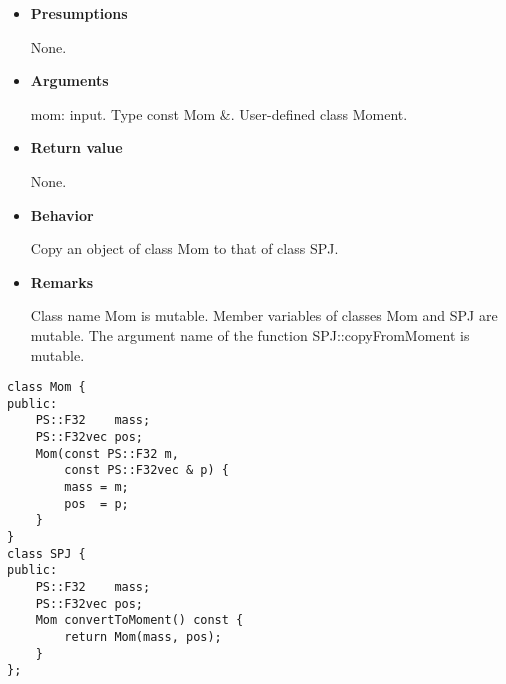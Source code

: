 \begin{itemize}

\item {\bf Presumptions}

  None.
  
\item {\bf Arguments}

   mom: input. Type const Mom \&. User-defined class Moment.

\item {\bf Return value}

  None.
  
\item {\bf Behavior}

  Copy an object of class Mom to that of class SPJ.

\item {\bf Remarks}

  Class name Mom is mutable. Member variables of classes Mom and SPJ
  are mutable. The argument name of the function SPJ::copyFromMoment
  is mutable.

\end{itemize}


\begin{screen}
\begin{verbatim}
class Mom {
public:
    PS::F32    mass;
    PS::F32vec pos;
    Mom(const PS::F32 m,
        const PS::F32vec & p) {
        mass = m;
        pos  = p;
    }
}
class SPJ {
public:
    PS::F32    mass;
    PS::F32vec pos;
    Mom convertToMoment() const {
        return Mom(mass, pos);
    }
};
\end{verbatim}
\end{screen}

